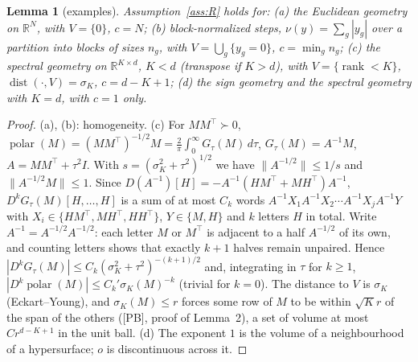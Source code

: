 \documentclass[10pt]{article}
\newtheorem{lemma}[theorem]{Lemma}
\theoremstyle{definition}
\theoremstyle{remark}
\newcommand{\R}{\mathbb{R}}
\newcommand{\polar}{\operatorname{polar}}
\newcommand{\dist}{\operatorname{dist}}
\newcommand{\PB}{\textup{[PB]}}
\begin{document}
\begin{lemma}[examples]\label{lem:examples}
Assumption~\ref{ass:R} holds for: (a) the Euclidean geometry on $\R^N$, with $V=\{0\}$, $c=N$; (b) block-normalized
steps, $\nu(y)=\sum_g|y_g|$ over a partition into blocks of sizes $n_g$, with $V=\bigcup_g\{y_g=0\}$, $c=\min_gn_g$;
(c) the spectral geometry on $\R^{K\times d}$, $K<d$ (transpose if $K>d$), with $V=\{\operatorname{rank}<K\}$,
$\dist(\cdot,V)=\sigma_K$, $c=d-K+1$; (d) the sign geometry and the spectral geometry with $K=d$, with $c=1$ only.
\end{lemma}
\begin{proof}
(a), (b): homogeneity. (c) For $MM^\top\succ0$, $\polar(M)=(MM^\top)^{-1/2}M=\frac2\pi\int_0^\infty G_\tau(M)\,d\tau$,
$G_\tau(M)=A^{-1}M$, $A=MM^\top+\tau^2I$. With $s=(\sigma_K^2+\tau^2)^{1/2}$ we have $\|A^{-1/2}\|\le1/s$ and
$\|A^{-1/2}M\|\le1$. Since $D(A^{-1})[H]=-A^{-1}(HM^\top+MH^\top)A^{-1}$, $D^kG_\tau(M)[H,\dots,H]$ is a sum of at most
$C_k$ words $A^{-1}X_1A^{-1}X_2\cdots A^{-1}X_jA^{-1}Y$ with $X_i\in\{HM^\top,MH^\top,HH^\top\}$, $Y\in\{M,H\}$ and $k$
letters $H$ in total. Write $A^{-1}=A^{-1/2}A^{-1/2}$: each letter $M$ or $M^\top$ is adjacent to a half $A^{-1/2}$ of
its own, and counting letters shows that exactly $k+1$ halves remain unpaired. Hence
$|D^kG_\tau(M)|\le C_k(\sigma_K^2+\tau^2)^{-(k+1)/2}$ and, integrating in $\tau$ for $k\ge1$, $|D^k\polar(M)|\le C_k'\sigma_K(M)^{-k}$ (trivial for $k=0$).
The distance to $V$ is $\sigma_K$ (Eckart--Young), and $\sigma_K(M)\le r$ forces some row of $M$ to be within
$\sqrt Kr$ of the span of the others (\PB, proof of Lemma~2), a set of volume at most $Cr^{d-K+1}$ in the unit ball.
(d) The exponent $1$ is the volume of a neighbourhood of a hypersurface; $o$ is discontinuous across it.
\end{proof}
\end{document}
